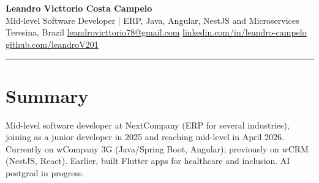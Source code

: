 \begin{center}
  {\LARGE\bfseries Leandro Victtorio Costa Campelo}\\[4pt]
  {\small Mid-level Software Developer | ERP, Java, Angular, NestJS and Microservices}\\[2pt]
  {\small Teresina, Brazil {\textbullet} \href{mailto:leandrovicttorio78@gmail.com}{leandrovicttorio78@gmail.com} {\textbullet} \href{https://www.linkedin.com/in/leandro-campelo/}{linkedin.com/in/leandro-campelo} {\textbullet} \href{https://github.com/leandroV201}{github.com/leandroV201}}
\end{center}
\vspace{-0.9em}
\noindent\rule{\linewidth}{0.3pt}

\section{Summary}
Mid-level software developer at NextCompany (ERP for several industries), joining as a junior developer in 2025 and reaching mid-level in April 2026. Currently on wCompany 3G (Java/Spring Boot, Angular); previously on wCRM (NestJS, React). Earlier, built Flutter apps for healthcare and inclusion. AI postgrad in progress.
